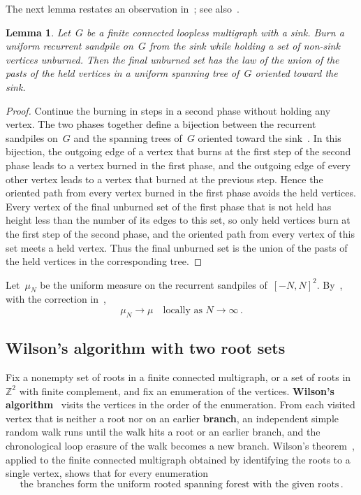 \documentclass[11pt]{amsart}
\numberwithin{equation}{section}
\newtheorem{lemma}[equation]{Lemma}
\newcommand{\Z}{\mathbb Z}
\begin{document}
The next lemma restates an observation in~\citet[proof of Theorem~3]{JaraiWerning2014}; see also~\citet[Lemmas~3 and~4]{GamlinJarai2014}.

\begin{lemma}\label{fv:held-burning}
Let~$G$ be a finite connected loopless multigraph with a sink. Burn a uniform recurrent sandpile on~$G$ from the sink while holding a set of non-sink vertices unburned. Then the final unburned set has the law of the union of the pasts of the held vertices in a uniform spanning tree of~$G$ oriented toward the sink.
\end{lemma}

\begin{proof}
Continue the burning in steps in a second phase without holding any vertex. The two phases together define a bijection between the recurrent sandpiles on~$G$ and the spanning trees of~$G$ oriented toward the sink~\citep[Section~3.1]{JaraiWerning2014}. In this bijection, the outgoing edge of a vertex that burns at the first step of the second phase leads to a vertex burned in the first phase, and the outgoing edge of every other vertex leads to a vertex that burned at the previous step. Hence the oriented path from every vertex burned in the first phase avoids the held vertices. Every vertex of the final unburned set of the first phase that is not held has height less than the number of its edges to this set, so only held vertices burn at the first step of the second phase, and the oriented path from every vertex of this set meets a held vertex. Thus the final unburned set is the union of the pasts of the held vertices in the corresponding tree.
\end{proof}

Let~$\mu_N$ be the uniform measure on the recurrent sandpiles of~$[-N,N]^2$. By~\citet[Theorem~1]{AthreyaJarai2004}, with the correction in~\citet{AthreyaJarai2006},
\begin{equation}\label{pre:sandpile-limit}
\mu_N\to\mu\quad\text{locally as }N\to\infty\,.
\end{equation}

\subsection{Wilson's algorithm with two root sets}\label{ssec:prelim-wilson}

Fix a nonempty set of roots in a finite connected multigraph, or a set of roots in~$\Z^2$ with finite complement, and fix an enumeration of the vertices. \textbf{Wilson's algorithm}~\citep{Wilson1996} visits the vertices in the order of the enumeration. From each visited vertex that is neither a root nor on an earlier \textbf{branch}, an independent simple random walk runs until the walk hits a root or an earlier branch, and the chronological loop erasure of the walk becomes a new branch. Wilson's theorem~\citep[Theorem~4.1]{LyonsPeres2016}, applied to the finite connected multigraph obtained by identifying the roots to a single vertex, shows that for every enumeration
\begin{equation}\label{pre:wilson}
\text{the branches form the uniform rooted spanning forest with the given roots}\,.
\end{equation}
\end{document}
